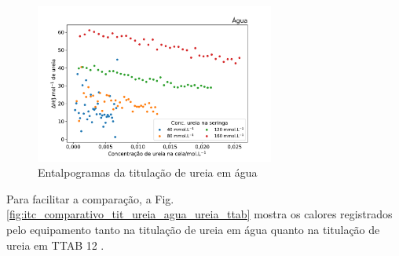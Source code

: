 
\begin{figure}[H]
	\centering
	\includegraphics[width=0.7\textwidth]{imagens/itc/interacao_branco}
	\caption{Entalpogramas da titulação de ureia em água}
	\label{fig:itc_interacaoUrAgua}
\end{figure}
	
	 Para facilitar a comparação, a Fig. \ref{fig:itc_comparativo_tit_ureia_agua_ureia_ttab} mostra os calores registrados pelo equipamento tanto na titulação de ureia em água quanto na titulação de ureia em TTAB 12 \mM. 
	 
